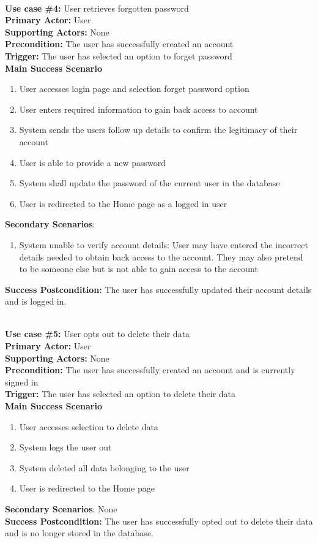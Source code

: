 \documentclass{article}
\begin{document}
\noindent\\
\textbf{Use case \#4:} User retrieves forgotten password\\
\textbf{Primary Actor:} User\\
\textbf{Supporting Actors:} None\\
\textbf{Precondition:} The user has successfully created an account\\
\textbf{Trigger:} The user has selected an option to forget password\\
\textbf{Main Success Scenario}
\begin{enumerate}
    \item User accesses login page and selection forget password option
    \item User enters required information to gain back access to account
    \item System sends the users follow up details to confirm the legitimacy of their account
    \item User is able to provide a new password
    \item System shall update the password of the current user in the database 
    \item User is redirected to the Home page as a logged in user
\end{enumerate}
\textbf{Secondary Scenarios}:
\begin{enumerate}
    \item System unable to verify account details: User may have entered the incorrect details needed to obtain back access to the account. They may also pretend to be someone else but is not able to gain access to the account
\end{enumerate}
\textbf{Success Postcondition:} The user has successfully updated their account details and is logged in. \newline

\noindent\\
\textbf{Use case \#5:} User opts out to delete their data\\
\textbf{Primary Actor:} User\\
\textbf{Supporting Actors:} None\\
\textbf{Precondition:} The user has successfully created an account and is currently signed in\\
\textbf{Trigger:} The user has selected an option to delete their data\\
\textbf{Main Success Scenario}
\begin{enumerate}
    \item User accesses selection to delete data
    \item System logs the user out
    \item System deleted all data belonging to the user
    \item User is redirected to the Home page
\end{enumerate}
\textbf{Secondary Scenarios}:
None\\
\textbf{Success Postcondition:} The user has successfully opted out to delete their data and is no longer stored in the database. \newline
\end{document}
